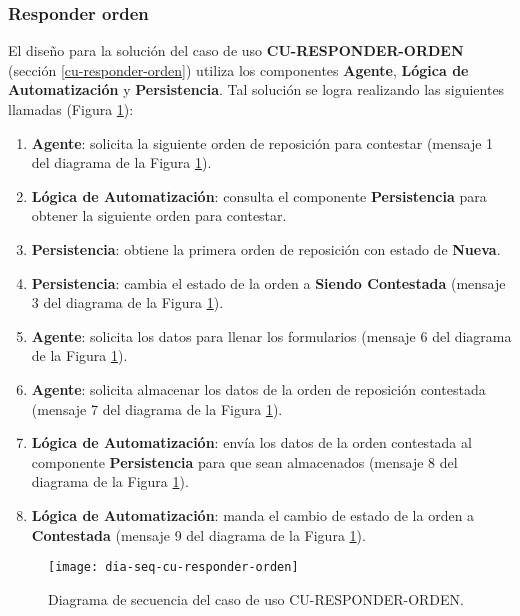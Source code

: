 \subsubsection{Responder orden}
El diseño para la solución del caso de uso \textbf{CU-RESPONDER-ORDEN} (sección \ref{cu-responder-orden}) utiliza los componentes \textbf{Agente}, \textbf{Lógica de Automatización} y \textbf{Persistencia}. Tal solución se logra realizando las siguientes llamadas (Figura \ref{fig:dia-seq-cu-responder-orden}):
\begin{enumerate}
	\item \textbf{Agente}: solicita la siguiente orden de reposición para contestar (mensaje 1 del diagrama de la Figura \ref{fig:dia-seq-cu-responder-orden}).
	\item \textbf{Lógica de Automatización}: consulta el componente \textbf{Persistencia} para obtener la siguiente orden para contestar.
	\item \textbf{Persistencia}: obtiene la primera orden de reposición con estado de \textbf{Nueva}.
	\item \textbf{Persistencia}: cambia el estado de la orden a \textbf{Siendo Contestada} (mensaje 3 del diagrama de la Figura \ref{fig:dia-seq-cu-responder-orden}).
	\item \textbf{Agente}: solicita los datos para llenar los formularios (mensaje 6 del diagrama de la Figura \ref{fig:dia-seq-cu-responder-orden}).
	\item \textbf{Agente}: solicita almacenar los datos de la orden de reposición contestada (mensaje 7 del diagrama de la Figura \ref{fig:dia-seq-cu-responder-orden}).
	\item \textbf{Lógica de Automatización}: envía los datos de la orden contestada al componente \textbf{Persistencia} para que sean almacenados (mensaje 8 del diagrama de la Figura \ref{fig:dia-seq-cu-responder-orden}).
	\item \textbf{Lógica de Automatización}: manda el cambio de estado de la orden a \textbf{Contestada} (mensaje 9 del diagrama de la Figura \ref{fig:dia-seq-cu-responder-orden}).
\end{enumerate}

\begin{figure}[h]
	\centering
	\texttt{[image: dia-seq-cu-responder-orden]}
	\caption{Diagrama de secuencia del caso de uso CU-RESPONDER-ORDEN.}
	\label{fig:dia-seq-cu-responder-orden}
\end{figure}

